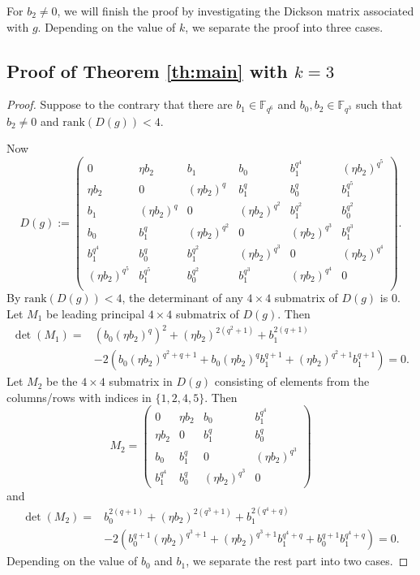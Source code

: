 \documentclass{amsart}
\theoremstyle{plain}
\theoremstyle{definition}
\newcommand{\rank}{\mathrm{rank}}
\begin{document}
	For $b_2\neq 0$, we will finish the proof by investigating the Dickson matrix associated with $g$. Depending on the value of $k$, we separate the proof into three cases.
	
	\subsection{Proof of Theorem \ref{th:main} with $k=3$}\label{subsec:k=3}
	\begin{proof}
		Suppose to the contrary that there are $b_1\in \mathbb{F}_{q^6} $ and $b_0,b_2\in\mathbb{F}_{q^3}$ such that $b_2\neq0$ and  $\rank(D( g))<4$. 
		
		Now
		$$D( g):=
		\begin{pmatrix}
			0& \eta b_2 & b_1&b_0&  b_1^{q^4}&(\eta b_2)^{q^5}\\ 
			\eta b_2&0& (\eta b_2)^q & b_1^q&b_0^q&  b_1^{q^5}\\
			b_1&(\eta b_2)^{q}&0& (\eta b_2)^{q^2} &b_1^{q^2}&b_0^{q^2}\\
			b_0&b_1^{q}&(\eta b_2)^{q^2}&0& (\eta b_2)^{q^3} &b_1^{q^3}\\
			b_1^{q^4}&b_0^{q}&b_1^{q^2}&(\eta b_2)^{q^3}&0&(\eta b_2)^{q^4} \\
			(\eta b_2)^{q^5}&b_1^{q^5}&b_0^{q^2}&b_1^{q^3}&(\eta b_2)^{q^4}&0 \\
		\end{pmatrix}.$$ 
		By  $\rank(D( g))<4$, the determinant of any $4\times 4$ submatrix of $D( g)$ is $0$. 
		Let $M_1$ be leading principal $4\times 4$ submatrix of $D( g)$.
		Then 
		\begin{align}
			\nonumber
			\det (M_1)
			=&(b_0(\eta b_2)^q)^2+(\eta b_2)^{2(q^2+1)}+b_1^{2(q+1)}\\
			&-2\left(b_0(\eta b_2)^{q^2+q+1}+b_0(\eta b_2)^qb_1^{q+1}+(\eta b_2)^{q^2+1}b_1^{q+1}\right)=0.
			\label{eq_2_4}
		\end{align}
		Let $M_2$ be the $4\times 4$ submatrix in $D( g)$ consisting of elements from the columns/rows with indices in $\{1,2,4,5\}$.
		Then 	$$M_2=
		\begin{pmatrix}
			0& \eta b_2 &b_0&b_1^{q^4}\\
			\eta b_2&0& b_1^q&b_0^q\\
			b_0&b_1^q&0& (\eta b_2)^{q^3}\\
			b_1^{q^4}&b_0^{q}& (\eta b_2)^{q^3}&0
		\end{pmatrix}$$
		and
		\begin{align}
			\nonumber
			\det (M_2)=&b_0^{2(q+1)}+(\eta b_2)^{2(q^3+1)}+b_1^{2(q^4+q)}\\
			&-2\left(b_0^{q+1}(\eta b_2)^{q^3+1}+(\eta b_2)^{q^3+1}b_1^{q^4+q}+b_0^{q+1}b_1^{q^4+q}\right)=0. 		\label{eq_2_5}
		\end{align}
		Depending on the value of $b_0$ and $b_1$, we separate the rest part into two cases.
		

\end{proof}
\end{document}
